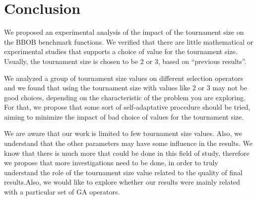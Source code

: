 \section{Conclusion}
\label{sec:conclusion}


We proposed an experimental analysis of the impact of the tournament size on the BBOB benchmark functions. We verified that there are little mathematical or experimental studies that supports a choice of value for the tournament size. Usually, the tournament size is chosen to be 2 or 3, based on ``previous results''.
 
 
We analyzed a group of tournament size values on different selection operators and we found that using the tournament size with values like 2 or 3 may not be good choices, depending on the characteristic of the problem you are exploring. For that, we propose that some sort of self-adaptative procedure should be tried, aiming to minimize the impact of bad choice of values for the tournament size.

We are aware that our work is limited to few tournament size values. Also, we understand that the other parameters may have some influence in the results. We know that there is much more that could be done in this field of study, therefore we propose that more investigations need to be done, in order to truly understand the role of the tournament size value related to the quality of final results.Also, we would like to explore whether our results were mainly related with a particular set of GA operators.